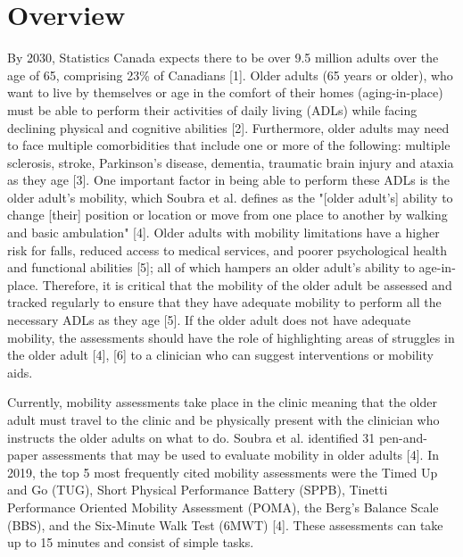 %


\section{Overview}
By 2030, Statistics Canada expects there to be over 9.5 million adults over the age of 65, 
comprising 23\% of Canadians [1]. Older adults (65 years or older), who want to live by themselves 
or age in the comfort of their homes (aging-in-place) must be able to perform their activities of 
daily living (ADLs) while facing declining physical and cognitive abilities [2]. Furthermore, older 
adults may need to face multiple comorbidities that include one or more of the following: 
multiple sclerosis, stroke, Parkinson's disease, dementia, traumatic brain injury 
and ataxia as they age [3]. One important factor in being able to perform 
these ADLs is the older adult's mobility, which Soubra et al. defines as the "[older adult's] 
ability to change [their] position or location or move from one place to another by walking 
and basic ambulation" [4]. Older adults with mobility limitations have a higher risk for falls, 
reduced access to medical services, and poorer psychological health and functional abilities [5]; 
all of which hampers an older adult’s ability to age-in-place. Therefore, it is critical that the 
mobility of the older adult be assessed and tracked regularly to ensure that they have adequate 
mobility to perform all the necessary ADLs as they age [5]. If the older adult does not have 
adequate mobility, the assessments should have the role of highlighting areas of struggles in 
the older adult [4], [6] to a clinician who can suggest interventions or mobility aids.

Currently, mobility assessments take place in the clinic meaning that the older adult must travel 
to the clinic and be physically present with the clinician who instructs the older adults on what 
to do. Soubra et al. identified 31 pen-and-paper assessments that may be used to evaluate mobility 
in older adults [4]. In 2019, the top 5 most frequently cited mobility assessments were the Timed 
Up and Go (TUG), Short Physical Performance Battery (SPPB), Tinetti Performance Oriented Mobility 
Assessment (POMA), the Berg's Balance Scale (BBS), and the Six-Minute Walk Test (6MWT) [4]. 
These assessments can take up to 15 minutes and consist of simple tasks. 

